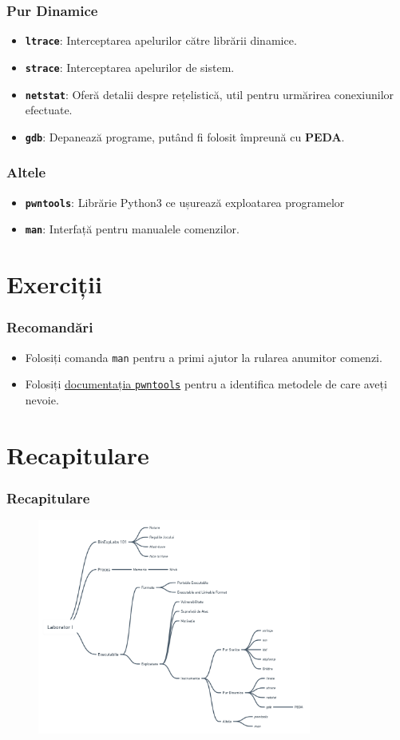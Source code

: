 \documentclass[xcolor={table}]{beamer}
\begin{document}
	\begin{frame}
		\frametitle{Pur Dinamice}\pause
		\begin{itemize}[<+->]
		    \item \textbf{\texttt{ltrace}}: Interceptarea apelurilor către librării dinamice.
		    \item \textbf{\texttt{strace}}: Interceptarea apelurilor de sistem.
		    \item \textbf{\texttt{netstat}}: Oferă detalii despre rețelistică, util pentru urmărirea conexiunilor efectuate.
		    \item \textbf{\texttt{gdb}}: Depanează programe, putând fi folosit împreună cu \textbf{PEDA}.
	    \end{itemize}
	\end{frame}
	
	\begin{frame}
		\frametitle{Altele}\pause
		\begin{itemize}[<+->]
		    \item \textbf{\texttt{pwntools}}: Librărie Python3 ce ușurează exploatarea programelor
		    \item \textbf{\texttt{man}}: Interfață pentru manualele comenzilor.
	    \end{itemize}
	\end{frame}
	
	\section{Exerciții}
	
	\begin{frame}
		\frametitle{Recomandări}\pause
		\begin{itemize}[<+->]
		    \item Folosiți comanda \texttt{man} pentru a primi ajutor la rularea anumitor comenzi.
		    \item Folosiți \href{https://docs.pwntools.com/en/stable/}{documentația \texttt{pwntools}} pentru a identifica metodele de care aveți nevoie.
	    \end{itemize}
	\end{frame}
	
	\section{Recapitulare}
	
	\begin{frame}
		\frametitle{Recapitulare}\pause
		\begin{figure}
            \centering
            \includegraphics[width=9cm]{images/recap.png}
        \end{figure}
	\end{frame}
\end{document}
